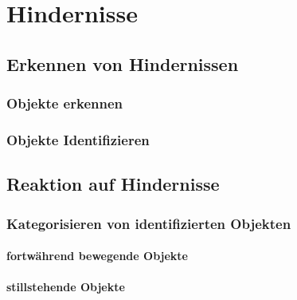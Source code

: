 \chapter{Hindernisse}
	\section{Erkennen von Hindernissen}
		\subsection{Objekte erkennen}
		\subsection{Objekte Identifizieren}
	\section{Reaktion auf Hindernisse}
		\subsection{Kategorisieren von identifizierten Objekten}
			\subsubsection{fortwährend bewegende Objekte}
			\subsubsection{stillstehende Objekte}